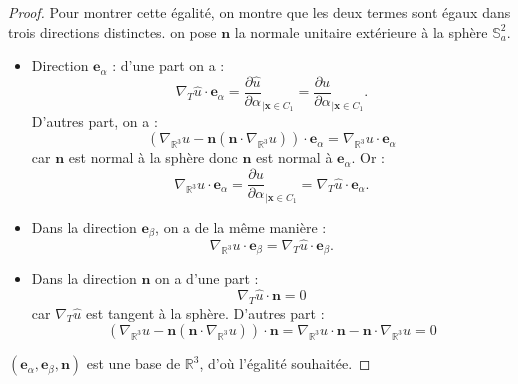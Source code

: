 \begin{proof}
Pour montrer cette égalité, on montre que les deux termes sont égaux dans trois directions distinctes. on pose $\mathbf{n}$ la normale unitaire extérieure à la sphère $\mathbb{S}_a^2$.
\begin{itemize}
\item Direction $\mathbf{e}_{\alpha}$ :
d'une part on a :
\begin{equation}
\nabla_T \hat{u} \cdot \mathbf{e}_{\alpha} = \dfrac{\partial \hat{u}}{\partial \alpha}_{| \mathbf{x} \in C_1}= \dfrac{\partial u}{\partial \alpha}_{| \mathbf{x} \in C_1}.
\end{equation}
D'autres part, on a :
\begin{equation}
\left( \nabla_{\mathbb{R}^3} u - \mathbf{n} \left( \mathbf{n} \cdot \nabla_{\mathbb{R}^3} u \right) \right) \cdot \mathbf{e}_{\alpha} = \nabla_{\mathbb{R}^3} u \cdot \mathbf{e}_{\alpha}
\end{equation}
car $\mathbf{n}$ est normal à la sphère donc $\mathbf{n}$ est normal à $\mathbf{e}_{\alpha}$.
Or :
\begin{equation}
\nabla_{\mathbb{R}^3} u \cdot \mathbf{e}_{\alpha} = \dfrac{\partial u}{\partial \alpha}_{| \mathbf{x} \in C_1} = \nabla_T \hat{u} \cdot \mathbf{e}_{\alpha}.
\end{equation}

\item Dans la direction $\mathbf{e}_{\beta}$, on a de la même manière :
\begin{equation}
\nabla_{\mathbb{R}^3} u \cdot \mathbf{e}_{\beta} = \nabla_T \hat{u} \cdot \mathbf{e}_{\beta}.
\end{equation}

\item Dans la direction $\mathbf{n}$ on a d'une part :
\begin{equation}
\nabla_T \hat{u} \cdot \mathbf{n} = 0 
\end{equation}
car $\nabla_T \hat{u}$ est tangent à la sphère. D'autres part :
\begin{equation}
\left( \nabla_{\mathbb{R}^3} u - \mathbf{n} \left( \mathbf{n} \cdot \nabla_{\mathbb{R}^3} u \right) \right) \cdot \mathbf{n} = \nabla_{\mathbb{R}^3} u \cdot \mathbf{n}- \mathbf{n} \cdot \nabla_{\mathbb{R}^3} u = 0
\end{equation}
\end{itemize}
$(\mathbf{e}_{\alpha}, \mathbf{e}_{\beta}, \mathbf{n})$ est une base de $\mathbb{R}^3$, d'où l'égalité souhaitée.
\end{proof}




















